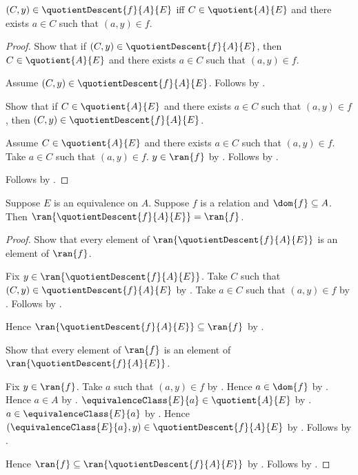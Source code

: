 \begin{proposition}\label{quotient_descent_iff}
    $(C,y)\in\quotientDescent{f}{A}{E}$ iff
        $C\in\quotient{A}{E}$ and
        there exists $a\in C$ such that $(a,y)\in f$.
\end{proposition}
\begin{proof}
    Show that if $(C,y)\in\quotientDescent{f}{A}{E}$, then
        $C\in\quotient{A}{E}$ and
        there exists $a\in C$ such that $(a,y)\in f$.
    \begin{subproof}
        Assume $(C,y)\in\quotientDescent{f}{A}{E}$.
        Follows by .
    \end{subproof}
    Show that if $C\in\quotient{A}{E}$ and
        there exists $a\in C$ such that $(a,y)\in f$, then
        $(C,y)\in\quotientDescent{f}{A}{E}$.
    \begin{subproof}
        Assume $C\in\quotient{A}{E}$ and
            there exists $a\in C$ such that $(a,y)\in f$.
        Take $a\in C$ such that $(a,y)\in f$.
        $y\in\ran{f}$ by .
        Follows by .
    \end{subproof}
    Follows by \auto.
\end{proof}

\begin{theorem}\label{quotient_descent_range}
    Suppose $E$ is an equivalence on $A$.
    Suppose $f$ is a relation and $\dom{f}\subseteq A$.
    Then
        $\ran{\quotientDescent{f}{A}{E}}=\ran{f}$.
\end{theorem}
\begin{proof}
    Show that every element of
        $\ran{\quotientDescent{f}{A}{E}}$ is an element of $\ran{f}$.
    \begin{subproof}
        Fix $y\in\ran{\quotientDescent{f}{A}{E}}$.
        Take $C$ such that
            $(C,y)\in\quotientDescent{f}{A}{E}$ by
            .
        Take $a\in C$ such that $(a,y)\in f$ by
            .
        Follows by .
    \end{subproof}
    Hence
        $\ran{\quotientDescent{f}{A}{E}}\subseteq\ran{f}$ by
        .

    Show that every element of $\ran{f}$ is an element of
        $\ran{\quotientDescent{f}{A}{E}}$.
    \begin{subproof}
        Fix $y\in\ran{f}$.
        Take $a$ such that $(a,y)\in f$ by .
        Hence $a\in\dom{f}$ by .
        Hence $a\in A$ by .
        $\equivalenceClass{E}{a}\in\quotient{A}{E}$ by
            .
        $a\in\equivalenceClass{E}{a}$ by
            .
        Hence
            $(\equivalenceClass{E}{a},y)
                \in\quotientDescent{f}{A}{E}$ by
            .
        Follows by .
    \end{subproof}
    Hence $\ran{f}\subseteq
        \ran{\quotientDescent{f}{A}{E}}$ by .
    Follows by .
\end{proof}


